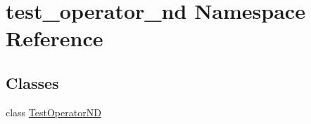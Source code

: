 \hypertarget{namespacetest__operator__nd}{}\section{test\+\_\+operator\+\_\+nd Namespace Reference}
\label{namespacetest__operator__nd}
\subsection*{Classes}
\begin{DoxyCompactItemize}
\item 
class \hyperlink{classtest__operator__nd_1_1TestOperatorND}{Test\+Operator\+ND}
\end{DoxyCompactItemize}
